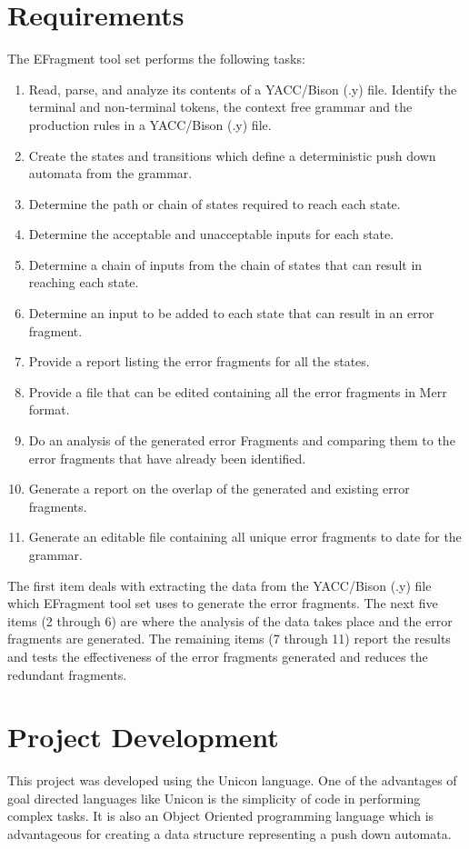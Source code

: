 \documentclass{article}
\begin{document}
\section{Requirements}

The EFragment tool set performs the following tasks:
\begin{enumerate}
\item Read, parse, and analyze its contents of a YACC/Bison (.y) file.  Identify the terminal and non-terminal tokens, the context free grammar and the production rules in a YACC/Bison (.y) file.
\item Create the states and transitions which define a deterministic push down automata from the grammar.
\item Determine the path or chain of states required to reach each state.
\item Determine the acceptable and unacceptable inputs for each state.
\item Determine a chain of inputs from the chain of states that can result in reaching each state.
\item Determine an input to be added to each state that can result in an error fragment.
\item Provide a report listing the error fragments for all the states.
\item Provide a file that can be edited containing all the error fragments in Merr format.
\item Do an analysis of the generated error Fragments and comparing them to the error fragments that have already been identified.
\item Generate a report on the overlap of the generated and existing error fragments.
\item Generate an editable file containing all unique error fragments to date for the grammar.
\end{enumerate}

The first item deals with extracting the data from the YACC/Bison (.y) file which EFragment tool set uses to generate the error fragments.  The next five items (2 through 6) are where the analysis of the data takes place and the error fragments are generated.  The remaining items (7 through 11) report the results and tests the effectiveness of the error fragments generated and reduces the redundant fragments.

\section{Project Development}
This project was developed using the Unicon language.  One of the advantages of goal directed languages like Unicon is the simplicity of code in performing complex tasks.  It is also an Object Oriented programming language which is advantageous for creating a data structure representing a push down automata.
\end{document}
